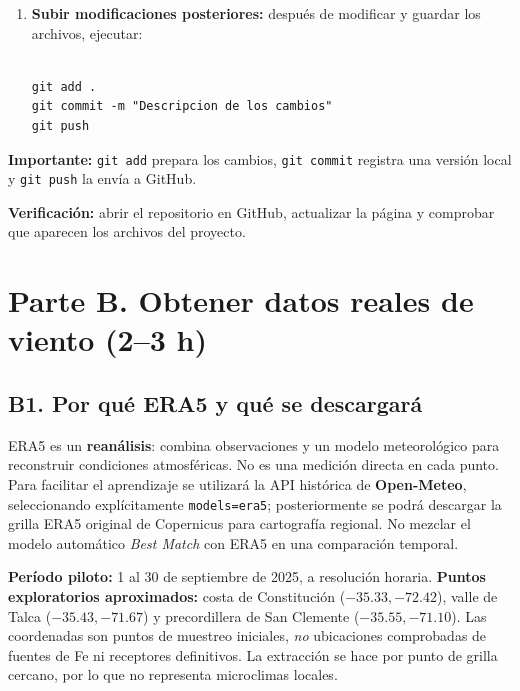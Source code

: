 \documentclass[11pt,a4paper]{article}
\begin{document}
\begin{enumerate}
    \begin{verbatim}

git push -u origin main
\end{verbatim}

    Si se solicita autenticación, seguir las
    instrucciones de GitHub.

    \item \textbf{Subir modificaciones posteriores:}
    después de modificar y guardar los archivos,
    ejecutar:

    \begin{verbatim}

git add .
git commit -m "Descripcion de los cambios"
git push
\end{verbatim}

\end{enumerate}

\noindent
\textbf{Importante:} \texttt{git add} prepara los cambios,
\texttt{git commit} registra una versión local y
\texttt{git push} la envía a GitHub.

\textbf{Verificación:} abrir el repositorio en GitHub,
actualizar la página y comprobar que aparecen los archivos
del proyecto.

\section{Parte B. Obtener datos reales de viento (2--3 h)}

\subsection*{B1. Por qué ERA5 y qué se descargará}

ERA5 es un \textbf{reanálisis}: combina observaciones y un modelo meteorológico para reconstruir condiciones atmosféricas. No es una medición directa en cada punto. Para facilitar el aprendizaje se utilizará la API histórica de \textbf{Open-Meteo}, seleccionando explícitamente \texttt{models=era5}; posteriormente se podrá descargar la grilla ERA5 original de Copernicus para cartografía regional. No mezclar el modelo automático \emph{Best Match} con ERA5 en una comparación temporal.

\textbf{Período piloto:} 1 al 30 de septiembre de 2025, a resolución horaria. \textbf{Puntos exploratorios aproximados:} costa de Constitución ($-35.33,-72.42$), valle de Talca ($-35.43,-71.67$) y precordillera de San Clemente ($-35.55,-71.10$). Las coordenadas son puntos de muestreo iniciales, \emph{no} ubicaciones comprobadas de fuentes de Fe ni receptores definitivos. La extracción se hace por punto de grilla cercano, por lo que no representa microclimas locales.
\end{document}
